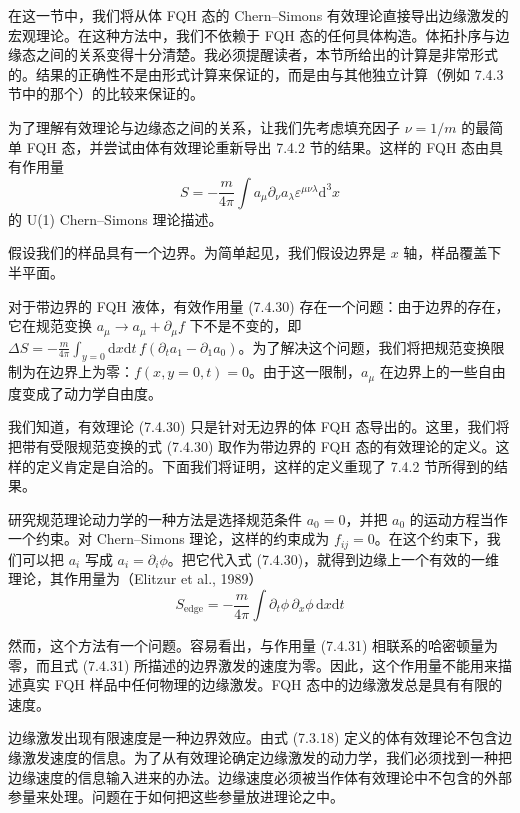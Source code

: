 在这一节中，我们将从体 FQH 态的 Chern--Simons 有效理论直接导出边缘激发的宏观理论。在这种方法中，我们不依赖于 FQH 态的任何具体构造。体拓扑序与边缘态之间的关系变得十分清楚。我必须提醒读者，本节所给出的计算是非常形式的。结果的正确性不是由形式计算来保证的，而是由与其他独立计算（例如 7.4.3 节中的那个）的比较来保证的。

为了理解有效理论与边缘态之间的关系，让我们先考虑填充因子 $\nu=1/m$ 的最简单 FQH 态，并尝试由体有效理论重新导出 7.4.2 节的结果。这样的 FQH 态由具有作用量
\begin{equation*}
S=-\frac{m}{4\pi}\int a_\mu\partial_\nu a_\lambda\varepsilon^{\mu\nu\lambda}\mathrm{d}^3x
\tag{7.4.30}
\end{equation*}
的 U(1) Chern--Simons 理论描述。

假设我们的样品具有一个边界。为简单起见，我们假设边界是 $x$ 轴，样品覆盖下半平面。

对于带边界的 FQH 液体，有效作用量 (7.4.30) 存在一个问题：由于边界的存在，它在规范变换 $a_\mu\to a_\mu+\partial_\mu f$ 下不是不变的，即 $\Delta S=-\frac{m}{4\pi}\int_{y=0}\mathrm{d}x\mathrm{d}t\,f(\partial_ta_1-\partial_1a_0)$。为了解决这个问题，我们将把规范变换限制为在边界上为零：$f(x,y=0,t)=0$。由于这一限制，$a_\mu$ 在边界上的一些自由度变成了动力学自由度。

我们知道，有效理论 (7.4.30) 只是针对无边界的体 FQH 态导出的。这里，我们将把带有受限规范变换的式 (7.4.30) 取作为带边界的 FQH 态的有效理论的定义。这样的定义肯定是自洽的。下面我们将证明，这样的定义重现了 7.4.2 节所得到的结果。

研究规范理论动力学的一种方法是选择规范条件 $a_0=0$，并把 $a_0$ 的运动方程当作一个约束。对 Chern--Simons 理论，这样的约束成为 $f_{ij}=0$。在这个约束下，我们可以把 $a_i$ 写成 $a_i=\partial_i\phi$。把它代入式 (7.4.30)，就得到边缘上一个有效的一维理论，其作用量为（Elitzur et al., 1989）
\begin{equation*}
S_{\text{edge}}=-\frac{m}{4\pi}\int\partial_t\phi\,\partial_x\phi\,\mathrm{d}x\mathrm{d}t
\tag{7.4.31}
\end{equation*}

然而，这个方法有一个问题。容易看出，与作用量 (7.4.31) 相联系的哈密顿量为零，而且式 (7.4.31) 所描述的边界激发的速度为零。因此，这个作用量不能用来描述真实 FQH 样品中任何物理的边缘激发。FQH 态中的边缘激发总是具有有限的速度。

边缘激发出现有限速度是一种边界效应。由式 (7.3.18) 定义的体有效理论不包含边缘激发速度的信息。为了从有效理论确定边缘激发的动力学，我们必须找到一种把边缘速度的信息输入进来的办法。边缘速度必须被当作体有效理论中不包含的外部参量来处理。问题在于如何把这些参量放进理论之中。

